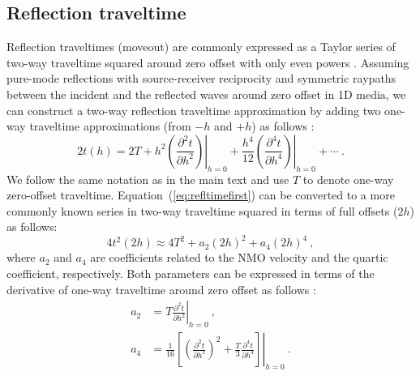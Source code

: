 \subsection{Reflection traveltime}
Reflection traveltimes (moveout) are commonly expressed as a Taylor series of two-way traveltime squared around zero offset with only even powers \cite[]{taner}. Assuming pure-mode reflections with source-receiver reciprocity and symmetric raypaths between the incident and the reflected waves around zero offset in 1D media, we can construct a two-way reflection traveltime approximation by adding two one-way traveltime approximations (from $-h$ and $+h$) as follows \cite[]{thomsenbook,tsvankinbook,zoneinterval}:
\begin{equation}
\label{eq:refltimefirst}
2 t (h) = 2 T +  h^2 \left.\left(\frac{\partial^2 t}{\partial h^2 }\right)\right\rvert_{h=0} + \frac{h^4}{12} \left.\left(\frac{\partial^4 t}{\partial h^4 }\right)\right\rvert_{h=0} + \cdots  ~.
\end{equation}
We follow the same notation as in the main text and use $T$ to denote one-way zero-offset traveltime. Equation~(\ref{eq:refltimefirst}) can be converted to a more commonly known series in two-way traveltime squared in terms of full offsets ($2h$) as follows:
\begin{equation}
\label{eq:refltime}
4 t^2 ( 2h ) \approx 4 T^2 +  a_2 (2 h)^2 + a_4 (2 h)^4~,
\end{equation}
where $a_2$ and $a_4$ are coefficients related to the NMO velocity and the quartic coefficient, respectively. Both parameters can be expressed in terms of the derivative of one-way traveltime around zero offset as follows \cite[]{alhti,zoneinterval}:
\begin{align} 
\label{eq:a2}
a_2 & =\left.T \frac{\partial^2 t}{\partial h^2 }\right\rvert_{h=0}~,\\
\label{eq:a4}
a_4 & = \left. \frac{1}{16}\left[ \left(\frac{\partial^2 t}{\partial h^2 }\right)^2 + \frac{T}{3} \frac{\partial^4 t}{\partial h^4 } \right]\right\rvert_{h=0}~.
\end{align}

